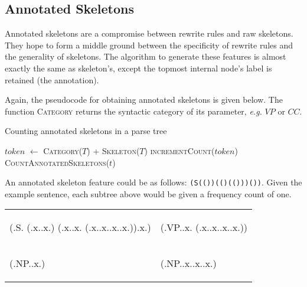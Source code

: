 \documentclass[conference]{IEEEtran}
\begin{document}
\subsection{Annotated Skeletons}

Annotated skeletons are a compromise between rewrite rules and raw skeletons.
They hope to form a middle ground between the specificity of rewrite rules and
the generality of skeletons.  The algorithm to generate these features is almost
exactly the same as skeleton's, except the topmost internal node's label is
retained (the annotation).

Again, the pseudocode for obtaining annotated skeletons is given below. The
function \textsc{Category} returns the syntactic category of its parameter,
\emph{e.g.} $VP$ or $CC$.

\begin{algorithm}
\caption{Counting annotated skeletons in a parse tree}
\begin{algorithmic}
    \State $token$ $\leftarrow$ \textsc{Category}($T$) + \textsc{Skeleton}($T$)
    \State \textsc{incrementCount}($token$)
        \State \textsc{CountAnnotatedSkeletons}($t$)
    \EndFor
    \EndProcedure
\end{algorithmic}
\end{algorithm}

An annotated skeleton feature could be as follows: \texttt{(S(())(()(()))())}.
Given the example sentence, each subtree above would be given a frequency count
of one.

\begin{center}
\begin{tabular}{ll}
    \begin{parsetree}
        (.S.
          (.x..x.)
          (.x..x.
          (.x..x..x..x.)).x.)
    \end{parsetree} &
    \begin{parsetree}
        (.VP..x.
        (.x..x..x..x.))
    \end{parsetree} \\
    \begin{parsetree}
        (.NP..x.)
    \end{parsetree} &
    \begin{parsetree}
        (.NP..x..x..x.)
    \end{parsetree} \\
\end{tabular}
\end{center}
\end{document}
